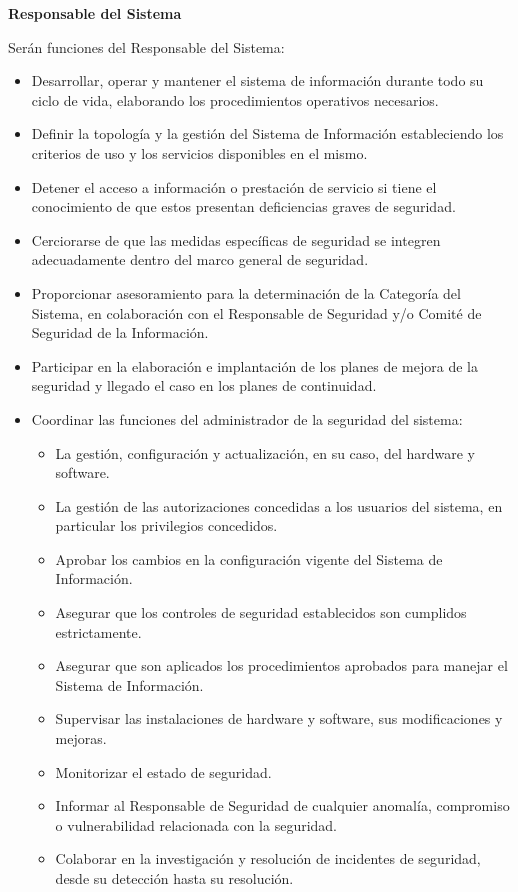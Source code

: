 \begin{enumerate}[label=\alph*)]
\textbf{Responsable del Sistema}

Serán funciones del Responsable del Sistema:

\begin{itemize}
  \item Desarrollar, operar y mantener el sistema de información durante todo su ciclo de vida, elaborando los procedimientos operativos necesarios.
  \item Definir la topología y la gestión del Sistema de Información estableciendo los criterios de uso y los servicios disponibles en el mismo.
  \item Detener el acceso a información o prestación de servicio si tiene el conocimiento de que estos presentan deficiencias graves de seguridad.
  \item Cerciorarse de que las medidas específicas de seguridad se integren adecuadamente dentro del marco general de seguridad.
  \item Proporcionar asesoramiento para la determinación de la Categoría del Sistema, en colaboración con el Responsable de Seguridad y/o Comité de Seguridad de la Información.
  \item Participar en la elaboración e implantación de los planes de mejora de la seguridad y llegado el caso en los planes de continuidad.
  \item Coordinar las funciones del administrador de la seguridad del sistema:
  \begin{itemize}
    \item La gestión, configuración y actualización, en su caso, del hardware y software.
    \item La gestión de las autorizaciones concedidas a los usuarios del sistema, en particular los privilegios concedidos.
    \item Aprobar los cambios en la configuración vigente del Sistema de Información.
    \item Asegurar que los controles de seguridad establecidos son cumplidos estrictamente.
    \item Asegurar que son aplicados los procedimientos aprobados para manejar el Sistema de Información.
    \item Supervisar las instalaciones de hardware y software, sus modificaciones y mejoras.
    \item Monitorizar el estado de seguridad.
    \item Informar al Responsable de Seguridad de cualquier anomalía, compromiso o vulnerabilidad relacionada con la seguridad.
    \item Colaborar en la investigación y resolución de incidentes de seguridad, desde su detección hasta su resolución.
  \end{itemize}
\end{itemize}


\end{enumerate}
